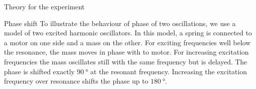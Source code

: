 \documentclass[pdftex, a4paper,11pt, twoside, UKenglish]{report}
\begin{document}
  \begin{chapter}{Theory for the experiment}
    \label{chp:Theory}
    
    
    
    \begin{section}{Phase shift}
      \label{chp:TheoryPhaseshift}
      To illustrate the behaviour of phase of two oscillations, we use a model
      of two excited harmonic oscillators. In this model, a spring is connected
      to a motor on one side and a mass on the other. For exciting frequencies
      well below the resonance, the mass moves in phase with to motor.
      For increasing excitation frequencies the mass oscillates still with the
      same frequency but is delayed. The phase is shifted exactly
      $\SI{90}{\degree}$ at the resonant frequency. Increasing the excitation
      frequency over resonance shifts the phase up to $\SI{180}{\degree}$.
      

\end{section}
\end{chapter}
\end{document}
